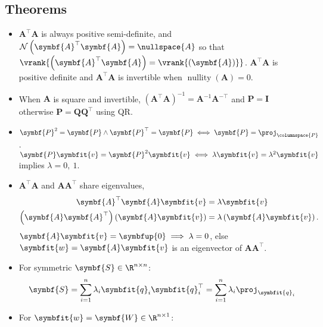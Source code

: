 \documentclass{article}
\DeclareMathOperator*{\nullity}{nullity}
\begin{document}
\begin{multicols*}{3}
    \section{Theorems}
    \begin{itemize}
        \item \(\symbf{A}^\top \symbf{A}\) is always positive semi-definite,
              and \(\mathcal{N}\left( \symbf{A}^\top\symbf{A} \right) = \nullspace{A}\) so that
              \(\vrank{\left( \symbf{A}^\top \symbf{A} \right) = \vrank{\left( \symbf{A} \right)}}\).
              \(\symbf{A}^\top \symbf{A}\) is positive definite and
              \(\symbf{A}^\top \symbf{A}\) is invertible when \(\nullity{\left( \symbf{A} \right)} = 0\).
        \item When \(\symbf{A}\) is square and invertible, \(\left( \symbf{A}^\top \symbf{A} \right)^{-1} = \symbf{A}^{-1} \symbf{A}^{-\top}\) and \(\symbf{P} = \symbf{I}\)
              otherwise \(\symbf{P} = \symbf{Q} \symbf{Q}^\top\) using QR\@.
        \item \(\symbf{P}^2 = \symbf{P} \land \symbf{P}^\top = \symbf{P} \iff \symbf{P} = \proj_{\columnspace{P}}\).
              \(\symbf{P} \symbfit{v} = \symbf{P}^2 \symbfit{v} \iff \lambda \symbfit{v} = \lambda^2 \symbfit{v}\) implies \(\lambda = 0,\: 1\).
        \item \(\symbf{A}^\top \symbf{A}\) and \(\symbf{A} \symbf{A}^\top\) share eigenvalues,
              \begin{align*}
                  \symbf{A}^\top \symbf{A} \symbfit{v}                                         & = \lambda \symbfit{v}                           \\
                  \left( \symbf{A} \symbf{A}^\top \right) \left( \symbf{A} \symbfit{v} \right) & = \lambda \left( \symbf{A} \symbfit{v} \right).
              \end{align*}
              \(\symbf{A} \symbfit{v} = \symbfup{0} \implies \lambda = 0\), else \(\symbfit{w} = \symbf{A} \symbfit{v}\) is an eigenvector of \(\symbf{A} \symbf{A}^\top\).
        \item For symmetric \(\symbf{S} \in \R^{n \times n}\):
              \begin{equation*}
                  \symbf{S} = \sum_{i = 1}^n \lambda_i \symbfit{q}_i \symbfit{q}_i^\top = \sum_{i = 1}^n \lambda_i \proj_{\symbfit{q}_i}
              \end{equation*}
        \item For \(\symbfit{w} = \symbf{W} \in \R^{n \times 1}\):
              \begin{align*}

\end{align*}
\end{itemize}
\end{multicols*}
\end{document}
